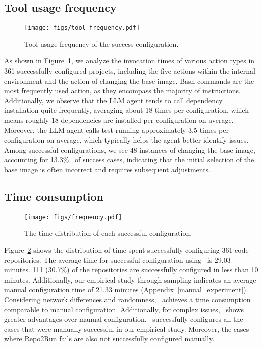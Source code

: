 

\subsection{Tool usage frequency}
\begin{figure}[t]
	\centering
	\texttt{[image: figs/tool\_frequency.pdf]}

    \caption{Tool usage frequency of the success configuration.}
\label{figs:tool_frequency}

\end{figure}



As shown in Figure~\ref{figs:tool_frequency}, we analyze the invocation times of various action types in 361 successfully configured projects, including the five actions within the internal environment and the action of changing the base image.  Bash commands are the most frequently used action, as they encompass the majority of instructions. Additionally, we observe that the LLM agent tends to call dependency installation quite frequently, averaging about 18 times per configuration, which means roughly 18 dependencies are installed per configuration on average. Moreover, the LLM agent calls test running approximately 3.5 times per configuration on average, which typically helps the agent better identify issues. Among successful configurations, we see 48 instances of changing the base image, accounting for 13.3\%~ of success cases, indicating that the initial selection of the base image is often incorrect and requires subsequent adjustments.


\subsection{Time consumption}


\begin{figure}[t]
\centering
\texttt{[image: figs/frequency.pdf]}

\caption{The time distribution of each successful configuration.}

\label{figs:frequency}
\end{figure}

Figure~\ref{figs:frequency} shows the distribution of time spent successfully configuring 361 code repositories. The average time for successful configuration using \tool~is 29.03 minutes. 111 (30.7\%) of the repositories are successfully configured in less than 10 minutes. Additionally, our empirical study through sampling indicates an average manual configuration time of 21.33 minutes (Appendix~\ref{manual_experiment}). Considering network differences and randomness, \tool~achieves a time consumption comparable to manual configuration. Additionally, for complex issues, \tool~shows greater advantages over manual configuration. \tool~successfully configures all the cases that were manually successful in our empirical study. Moreover, the cases where Repo2Run fails are also not successfully configured manually.


